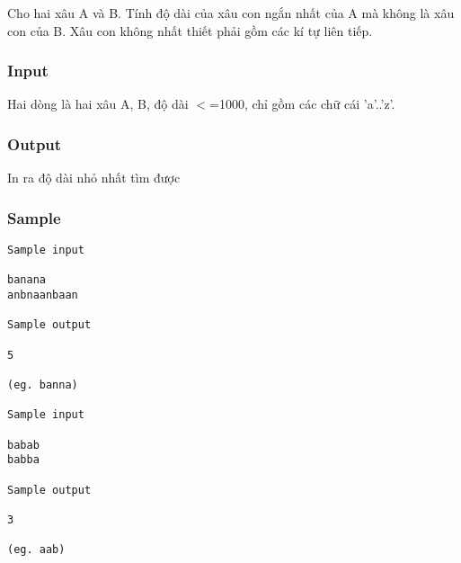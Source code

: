 



   Cho hai xâu A và B. Tính độ dài của xâu con ngắn nhất của A mà không là  xâu con của B. Xâu con không nhất thiết phải gồm các kí tự liên tiếp.  



\subsubsection{   Input  }



   Hai dòng là hai xâu A, B, độ dài $<$=1000, chỉ gồm các chữ cái 'a'..'z'.  



\subsubsection{   Output  }



   In ra độ dài nhỏ nhất tìm được  



\subsubsection{   Sample  }
\begin{verbatim}
Sample input
 
banana 
anbnaanbaan 
 
Sample output
 
5 
 
(eg. banna) 

Sample input
 
babab 
babba 
 
Sample output
 
3 
 
(eg. aab) 
\end{verbatim}